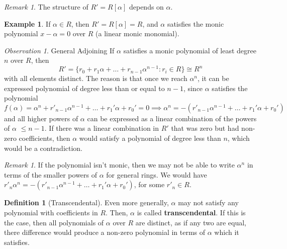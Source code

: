 \documentclass[12pt]{article}
\theoremstyle{definition}
\newtheorem{defn}[thm]{Definition}
\newtheorem{eg}[thm]{Example}
\theoremstyle{remark}
\newtheorem{rmk}[thm]{Remark}
\newtheorem{obs}[thm]{Observation}
\numberwithin{equation}{section}
\newcommand\B[1]{\textbf{ #1}}
\begin{document}
\vspace{15pt}


\begin{rmk}
        The structure of $R' = R[\alpha]$ depends on $\alpha$.
\end{rmk}

\vspace{15pt}

\begin{eg}
        If $\alpha \in R$, then $R' = R[\alpha] = R$, and $\alpha$ satisfies the monic polynomial $x-\alpha = 0$ over $R$ (a linear monic monomial).
\end{eg}


\vspace{15pt}

\begin{obs}{General Adjoining}
        If $\alpha$ satisfies a monic polynomial of least degree $n$ over $R$, then \begin{equation}
                R' = \{r_0+r_1\alpha + \hdots + r_{n-1}\alpha^{n-1}: r_i \in R\} \cong R^n
        \end{equation}
        with all elements distinct. The reason is that once we reach $\alpha^n$, it can be expressed polynomial of degree less than or equal to $n-1$, since $\alpha$ satisfies the polynomial \begin{equation}
                f(\alpha) = \alpha^n+r'_{n-1}\alpha^{n-1}+\hdots+r_1'\alpha+r_0'=0 \implies \alpha^n = -(r'_{n-1}\alpha^{n-1}+\hdots+r_1'\alpha+r_0')
        \end{equation}
        and all higher powers of $\alpha$ can be expressed as a linear combination of the powers of $\alpha$ $\leq n-1$. If there was a linear combination in $R'$ that was zero but had non-zero coefficients, then $\alpha$ would satisfy a polynomial of degree less than $n$, which would be a contradiction.
\end{obs}

\vspace{15pt}

\begin{rmk}
        If the polynomial isn't monic, then we may not be able to write $\alpha^n$ in terms of the smaller powers of $\alpha$ for general rings. We would have $r'_n\alpha^n = -(r'_{n-1}\alpha^{n-1}+\hdots+r_1'\alpha+r_0')$, for some $r'_n \in R$.
\end{rmk}

\vspace{15pt}


\begin{defn}[Transcendental]
        Even more generally, $\alpha$ may not satisfy any polynomial with coefficients in $R$. Then, $\alpha$ is called \B{transcendental}. If this is the case, then all polynomials of $\alpha$ over $R$ are distinct, as if any two are equal, there difference would produce a non-zero polynomial in terms of $\alpha$ which it satisfies.
\end{defn}
\end{document}
